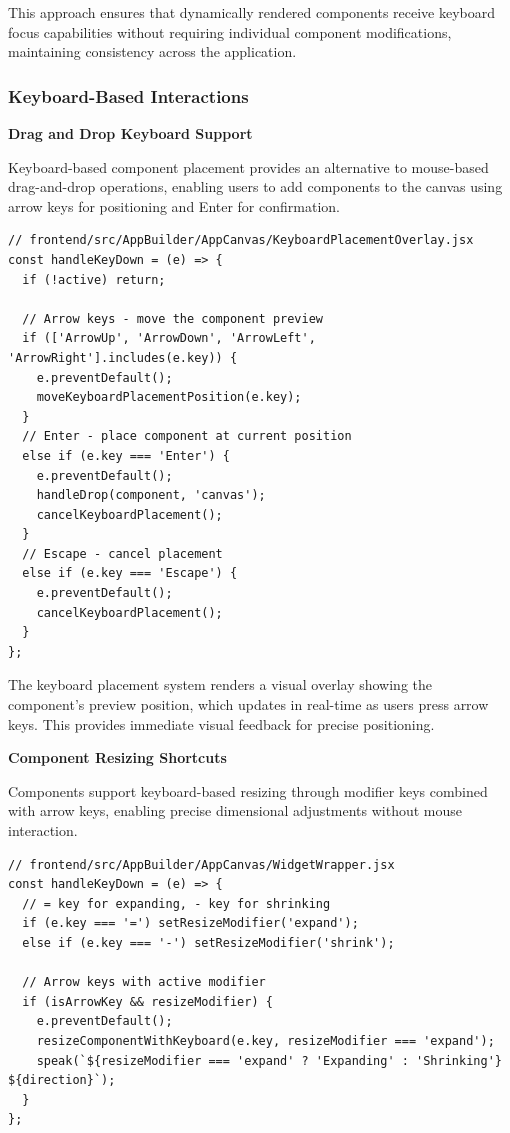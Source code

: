 This approach ensures that dynamically rendered components receive keyboard focus capabilities without requiring individual component modifications, maintaining consistency across the application.

\subsubsection{Keyboard-Based Interactions}

\textbf{Drag and Drop Keyboard Support}

Keyboard-based component placement provides an alternative to mouse-based drag-and-drop operations, enabling users to add components to the canvas using arrow keys for positioning and Enter for confirmation.

\begin{lstlisting}[caption=Keyboard Component Placement Implementation, label=lst:keyboard-dragdrop]
// frontend/src/AppBuilder/AppCanvas/KeyboardPlacementOverlay.jsx
const handleKeyDown = (e) => {
  if (!active) return;

  // Arrow keys - move the component preview
  if (['ArrowUp', 'ArrowDown', 'ArrowLeft', 'ArrowRight'].includes(e.key)) {
    e.preventDefault();
    moveKeyboardPlacementPosition(e.key);
  }
  // Enter - place component at current position
  else if (e.key === 'Enter') {
    e.preventDefault();
    handleDrop(component, 'canvas');
    cancelKeyboardPlacement();
  }
  // Escape - cancel placement
  else if (e.key === 'Escape') {
    e.preventDefault();
    cancelKeyboardPlacement();
  }
};
\end{lstlisting}

The keyboard placement system renders a visual overlay showing the component's preview position, which updates in real-time as users press arrow keys. This provides immediate visual feedback for precise positioning.

\textbf{Component Resizing Shortcuts}

Components support keyboard-based resizing through modifier keys combined with arrow keys, enabling precise dimensional adjustments without mouse interaction.

\begin{lstlisting}[caption=Keyboard Resizing Implementation, label=lst:keyboard-resize]
// frontend/src/AppBuilder/AppCanvas/WidgetWrapper.jsx
const handleKeyDown = (e) => {
  // = key for expanding, - key for shrinking
  if (e.key === '=') setResizeModifier('expand');
  else if (e.key === '-') setResizeModifier('shrink');
  
  // Arrow keys with active modifier
  if (isArrowKey && resizeModifier) {
    e.preventDefault();
    resizeComponentWithKeyboard(e.key, resizeModifier === 'expand');
    speak(`${resizeModifier === 'expand' ? 'Expanding' : 'Shrinking'} ${direction}`);
  }
};
\end{lstlisting}


